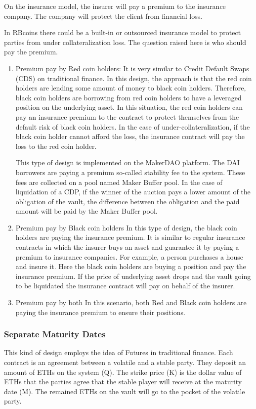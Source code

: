 On the insurance model, the insurer will pay a premium to the insurance company. The company will protect the client from financial loss. 

In RBcoins there could be a built-in or outsourced insurance model to protect parties from under collateralization loss. The question raised here is who should pay the premium.

\begin{enumerate}
	\item Premium pay by Red coin holders:
It is very similar to Credit Default Swaps (CDS) on traditional finance. In this design, the approach is that the red coin holders are lending some amount of money to black coin holders. Therefore, black coin holders are borrowing from red coin holders to have a leveraged position on the underlying asset. In this situation, the red coin holders can pay an insurance premium to the contract to protect themselves from the default risk of black coin holders. In the case of under-collateralization, if the black coin holder cannot afford the loss, the insurance contract will pay the loss to the red coin holder.

This type of design is implemented on the MakerDAO platform. The DAI borrowers are paying a premium so-called stability fee to the system. These fees are collected on a pool named Maker Buffer pool. In the case of liquidation of a CDP, if the winner of the auction pays a lower amount of the obligation of the vault, the difference between the obligation and the paid amount will be paid by the Maker Buffer pool.

	\item Premium pay by Black coin holders
In this type of design, the black coin holders are paying the insurance premium. It is similar to regular insurance contracts in which the insurer buys an asset and guarantee it by paying a premium to insurance companies. For example, a person purchases a house and insure it.
Here the black coin holders are buying a position and pay the insurance premium. If the price of underlying asset drops and the vault going to be liquidated the insurance contract will pay on behalf of the insurer.
	\item Premium pay by both
In this scenario, both Red and Black coin holders are paying the insurance premium to ensure their positions. 
\end{enumerate}

\subsubsection{Separate Maturity Dates}
This kind of design employs the idea of Futures in traditional finance. Each contract is an agreement between a volatile and a stable party. They deposit an amount of ETHs on the system (Q). The strike price (K) is the dollar value of ETHs that the parties agree that the stable player will receive at the maturity date (M). The remained ETHs on the vault will go to the pocket of the volatile party.

